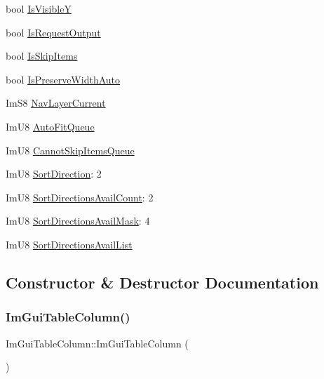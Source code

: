 \begin{DoxyCompactItemize}
bool \hyperlink{structImGuiTableColumn_a8d3dcb4e6e17ce02c2085310f4eb6e8e}{Is\+VisibleY}
\item 
bool \hyperlink{structImGuiTableColumn_a80c3b04e6038eaa8fa1eed8adbc67bab}{Is\+Request\+Output}
\item 
bool \hyperlink{structImGuiTableColumn_aacbea1502cc06a4a98ade4af143009e8}{Is\+Skip\+Items}
\item 
bool \hyperlink{structImGuiTableColumn_a37158a53f49ad89709cde68fb3179611}{Is\+Preserve\+Width\+Auto}
\item 
Im\+S8 \hyperlink{structImGuiTableColumn_a06689bad28c4f67a17cbf4529eb1acc0}{Nav\+Layer\+Current}
\item 
Im\+U8 \hyperlink{structImGuiTableColumn_a0cf98cb70102b97ccccbf5b4fc50117c}{Auto\+Fit\+Queue}
\item 
Im\+U8 \hyperlink{structImGuiTableColumn_abaa9d8ca04ae6e3fa8ee18724ef134ee}{Cannot\+Skip\+Items\+Queue}
\item 
Im\+U8 \hyperlink{structImGuiTableColumn_a5693cdc4775bdba3c1b295c77208e72d}{Sort\+Direction}\+: 2
\item 
Im\+U8 \hyperlink{structImGuiTableColumn_a49adaa46050cecbc2edff0c510973dd8}{Sort\+Directions\+Avail\+Count}\+: 2
\item 
Im\+U8 \hyperlink{structImGuiTableColumn_ae246b9be801b5dac7cfedeb91c5a9e86}{Sort\+Directions\+Avail\+Mask}\+: 4
\item 
Im\+U8 \hyperlink{structImGuiTableColumn_abbbce32f24f22d04bf128d9c58b77c4d}{Sort\+Directions\+Avail\+List}
\end{DoxyCompactItemize}


\subsection{Constructor \& Destructor Documentation}
\mbox{\label{structImGuiTableColumn_a6f0d942628f0d659d9227b1b2645e0dd}} 
\subsubsection{\texorpdfstring{Im\+Gui\+Table\+Column()}{ImGuiTableColumn()}}
{\footnotesize\ttfamily Im\+Gui\+Table\+Column\+::\+Im\+Gui\+Table\+Column (\begin{DoxyParamCaption}{ }\end{DoxyParamCaption})\hspace{0.3cm}{\ttfamily [inline]}}




